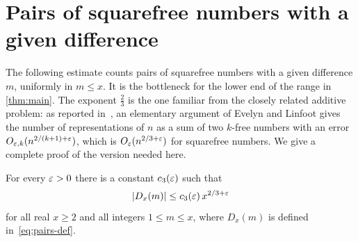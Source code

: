 \section{Pairs of squarefree numbers with a given difference}\label{sec:pairs}

The following estimate counts pairs of squarefree numbers with a given difference $m$, uniformly in $m\le x$. It is the bottleneck for the lower end of the range in \cref{thm:main}. The exponent $\frac23$ is the one familiar from the closely related additive problem: as reported in~\cite[§1]{BGPVW1998}, an elementary argument of Evelyn and Linfoot gives the number of representations of $n$ as a sum of two $k$-free numbers with an error $O_{\varepsilon,k}(n^{2/(k+1)+\varepsilon})$, which is $O_\varepsilon(n^{2/3+\varepsilon})$ for squarefree numbers. We give a complete proof of the version needed here.

\begin{proposition}\label{prop:pairs}
For every $\varepsilon>0$ there is a constant $c_3(\varepsilon)$ such that
\[
|D_x(m)|\le c_3(\varepsilon)\,x^{2/3+\varepsilon}
\]
for all real $x\ge2$ and all integers $1\le m\le x$, where $D_x(m)$ is defined in~\eqref{eq:pairs-def}.
\end{proposition}

